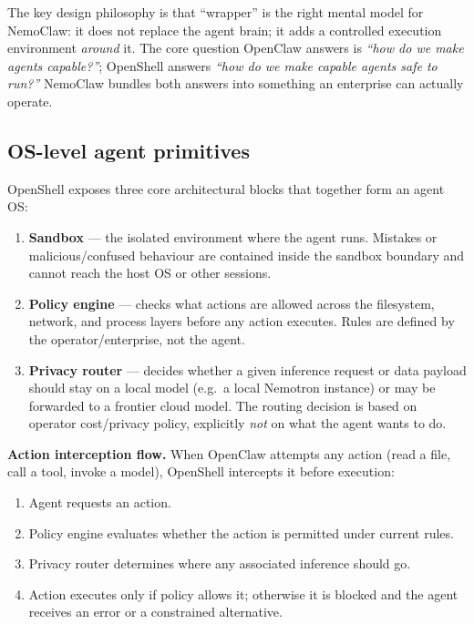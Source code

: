 The key design philosophy is that ``wrapper'' is the right mental model for NemoClaw:
it does not replace the agent brain; it adds a controlled execution environment
\emph{around} it. The core question OpenClaw answers is \emph{``how do we make agents
capable?''}; OpenShell answers \emph{``how do we make capable agents safe to run?''}
NemoClaw bundles both answers into something an enterprise can actually operate.

\subsection{OS-level agent primitives}

OpenShell exposes three core architectural blocks that together form an agent OS:

\begin{enumerate}
  \item \textbf{Sandbox} --- the isolated environment where the agent runs. Mistakes or
    malicious/confused behaviour are contained inside the sandbox boundary and cannot
    reach the host OS or other sessions.

  \item \textbf{Policy engine} --- checks what actions are allowed across the filesystem,
    network, and process layers before any action executes. Rules are defined by the
    operator/enterprise, not the agent.

  \item \textbf{Privacy router} --- decides whether a given inference request or data
    payload should stay on a local model (e.g.\ a local Nemotron instance) or may be
    forwarded to a frontier cloud model. The routing decision is based on operator
    cost/privacy policy, explicitly \emph{not} on what the agent wants to do.
\end{enumerate}

\textbf{Action interception flow.} When OpenClaw attempts any action (read a file, call
a tool, invoke a model), OpenShell intercepts it before execution:
\begin{enumerate}
  \item Agent requests an action.
  \item Policy engine evaluates whether the action is permitted under current rules.
  \item Privacy router determines where any associated inference should go.
  \item Action executes only if policy allows it; otherwise it is blocked and the
    agent receives an error or a constrained alternative.
\end{enumerate}


